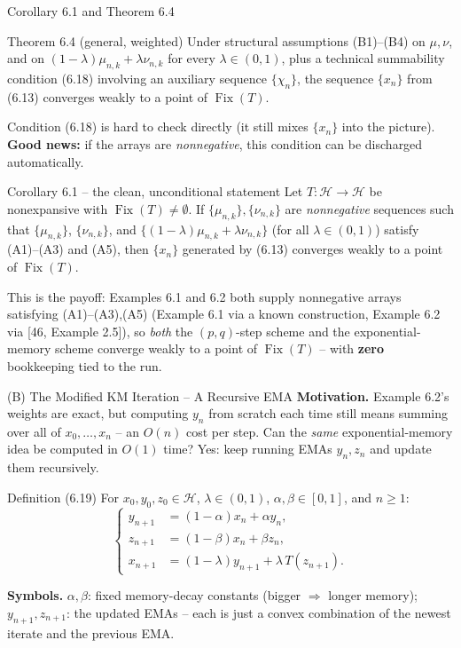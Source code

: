 \documentclass[aspectratio=169,10pt]{beamer}
\newcommand{\Hil}{\mathcal{H}}
\newcommand{\Fix}{\operatorname{Fix}}
\begin{document}
\begin{frame}[allowframebreaks]{Corollary 6.1 and Theorem 6.4}

\begin{block}{Theorem 6.4 (general, weighted)}
Under structural assumptions (B1)--(B4) on $\mu,\nu$, and on
$(1-\lambda)\mu_{n,k}+\lambda\nu_{n,k}$ for every $\lambda\in(0,1)$, plus a
technical summability condition (6.18) involving an auxiliary sequence
$\{\chi_n\}$, the sequence $\{x_n\}$ from (6.13) converges weakly to a
point of $\Fix(T)$.
\end{block}
Condition (6.18) is hard to check directly (it still mixes $\{x_n\}$ into
the picture). \textbf{Good news:} if the arrays are \emph{nonnegative},
this condition can be discharged automatically.

\begin{block}{Corollary 6.1 -- the clean, unconditional statement}
Let $T:\Hil\to\Hil$ be nonexpansive with $\Fix(T)\ne\emptyset$. If
$\{\mu_{n,k}\},\{\nu_{n,k}\}$ are \emph{nonnegative} sequences such that
$\{\mu_{n,k}\}$, $\{\nu_{n,k}\}$, and $\{(1-\lambda)\mu_{n,k}+\lambda\nu_{n,k}\}$
(for all $\lambda\in(0,1)$) satisfy (A1)--(A3) and (A5), then $\{x_n\}$
generated by (6.13) converges weakly to a point of $\Fix(T)$.
\end{block}

This is the payoff: Examples 6.1 and 6.2 both supply nonnegative arrays
satisfying (A1)--(A3),(A5) (Example 6.1 via a known construction, Example
6.2 via [46, Example 2.5]), so \emph{both} the $(p,q)$-step scheme and the
exponential-memory scheme converge weakly to a point of $\Fix(T)$ -- with
\textbf{zero} bookkeeping tied to the run.

\end{frame}

\begin{frame}{(B) The Modified KM Iteration -- A Recursive EMA}
\textbf{Motivation.} Example 6.2's weights are exact, but computing $y_n$
from scratch each time still means summing over all of $x_0,\dots,x_n$ --
an $O(n)$ cost per step. Can the \emph{same} exponential-memory idea be
computed in $O(1)$ time? Yes: keep running EMAs $y_n,z_n$ and update them
recursively.
\begin{block}{Definition (6.19)}
For $x_0,y_0,z_0\in\Hil$, $\lambda\in(0,1)$, $\alpha,\beta\in[0,1]$, and
$n\ge1$:
\[
\left\{
\begin{aligned}
y_{n+1} &= (1-\alpha)x_n + \alpha y_n, \\
z_{n+1} &= (1-\beta)x_n + \beta z_n, \\
x_{n+1} &= (1-\lambda)y_{n+1} + \lambda\, T(z_{n+1}).
\end{aligned}
\right.
\]
\end{block}
\textbf{Symbols.} $\alpha,\beta$: fixed memory-decay constants (bigger
$\Rightarrow$ longer memory); $y_{n+1},z_{n+1}$: the updated EMAs -- each
is just a convex combination of the newest iterate and the previous EMA.
\end{frame}
\end{document}
